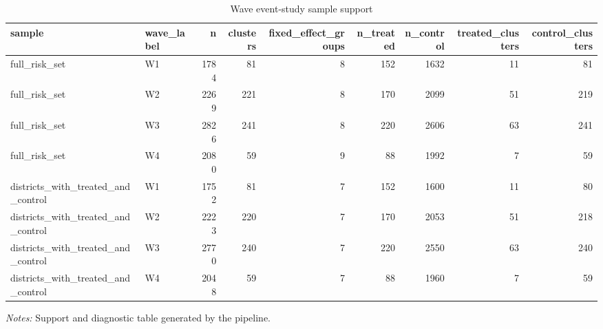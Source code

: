 \begin{table}[!htbp] \centering
\caption{Wave event-study sample support}
\begin{tabular}{llrrrrrrr}
\toprule
sample & wave\_label & n & clusters & fixed\_effect\_groups & n\_treated & n\_control & treated\_clusters & control\_clusters \\
\midrule
full\_risk\_set & W1 & 1784 & 81 & 8 & 152 & 1632 & 11 & 81 \\
full\_risk\_set & W2 & 2269 & 221 & 8 & 170 & 2099 & 51 & 219 \\
full\_risk\_set & W3 & 2826 & 241 & 8 & 220 & 2606 & 63 & 241 \\
full\_risk\_set & W4 & 2080 & 59 & 9 & 88 & 1992 & 7 & 59 \\
districts\_with\_treated\_and\_control & W1 & 1752 & 81 & 7 & 152 & 1600 & 11 & 80 \\
districts\_with\_treated\_and\_control & W2 & 2223 & 220 & 7 & 170 & 2053 & 51 & 218 \\
districts\_with\_treated\_and\_control & W3 & 2770 & 240 & 7 & 220 & 2550 & 63 & 240 \\
districts\_with\_treated\_and\_control & W4 & 2048 & 59 & 7 & 88 & 1960 & 7 & 59 \\
\bottomrule
\end{tabular}

\begin{minipage}{0.98\textwidth}
\footnotesize \textit{Notes:} Support and diagnostic table generated by the pipeline.
\end{minipage}
\end{table}
